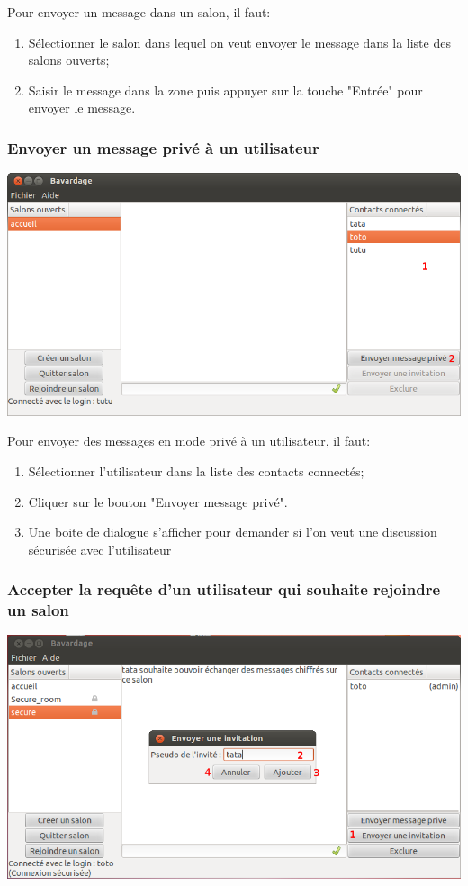 \documentclass[a4paper,11pt,french]{book}
\begin{document}
Pour envoyer un message dans un salon, il faut:
\begin{enumerate}
    \item Sélectionner le salon dans lequel on veut envoyer le message dans la liste des salons ouverts;
    \item Saisir le message dans la zone puis appuyer sur la touche "Entrée" pour envoyer le message.
\end{enumerate}

\subsubsection{Envoyer un message privé à un utilisateur}

\includegraphics[width=40em]{capture/mp_nsec.png}

Pour envoyer des messages en mode privé à un utilisateur, il faut:

\begin{enumerate}
    \item Sélectionner l'utilisateur dans la liste des contacts connectés;
    \item Cliquer sur le bouton "Envoyer message privé".
    \item Une boite de dialogue s'afficher pour demander si l'on veut une discussion sécurisée avec l'utilisateur 
\end{enumerate}

\subsubsection{Accepter la requête d'un utilisateur qui souhaite rejoindre un salon}

\includegraphics[width=40em]{capture/invit_room.png}
\end{document}

